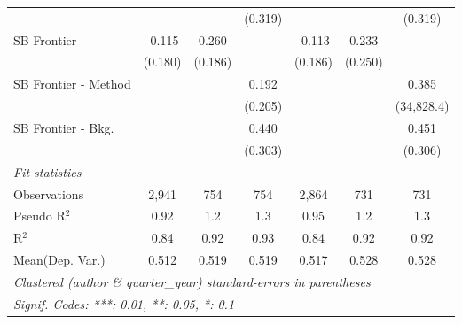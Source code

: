 \begin{tabular}{lcccccc}
                        &               &         & (0.319)      &               &         & (0.319)\\   
   SB Frontier          & -0.115        & 0.260   &              & -0.113        & 0.233   &   \\   
                        & (0.180)       & (0.186) &              & (0.186)       & (0.250) &   \\   
   SB Frontier - Method &               &         & 0.192        &               &         & 0.385\\   
                        &               &         & (0.205)      &               &         & (34,828.4)\\   
   SB Frontier - Bkg.   &               &         & 0.440        &               &         & 0.451\\   
                        &               &         & (0.303)      &               &         & (0.306)\\   
   \midrule
   \emph{Fit statistics}\\
   Observations         & 2,941         & 754     & 754          & 2,864         & 731     & 731\\  
   Pseudo R$^2$         & 0.92          & 1.2     & 1.3          & 0.95          & 1.2     & 1.3\\  
   R$^2$                & 0.84          & 0.92    & 0.93         & 0.84          & 0.92    & 0.92\\  
Mean(Dep. Var.) & 0.512 & 0.519 & 0.519 & 0.517 & 0.528 & 0.528 \\
   \midrule \midrule
   \multicolumn{7}{l}{\emph{Clustered (author \& quarter\_year) standard-errors in parentheses}}\\
   \multicolumn{7}{l}{\emph{Signif. Codes: ***: 0.01, **: 0.05, *: 0.1}}\\
\end{tabular}
\par\endgroup
